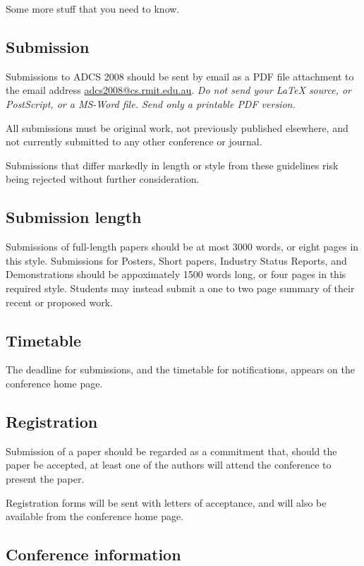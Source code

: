 \documentclass[twocolumn]{article}
\begin{document}
Some more stuff that you need to know.

\subsection{Submission}

Submissions to ADCS 2008 should be sent by email as a PDF file
attachment to the email address \url{adcs2008@cs.rmit.edu.au}.
\emph{Do not send your {\LaTeX} source, or PostScript, or a MS-Word
  file.  Send only a printable PDF version.}

All submissions must be original work, not previously published 
elsewhere, and not currently submitted to any other conference or
journal.

Submissions that differ markedly in length or style from these
guidelines risk being rejected without further consideration.

\subsection{Submission length}

Submissions of full-length papers should be at most 3000 words, or
eight pages in this style.  Submissions for Posters, Short papers,
Industry Status Reports, and Demonstrations should be appoximately
1500 words long, or four pages in this required style.  Students may
instead submit a one to two page summary of their recent or proposed
work.

\subsection{Timetable}

The deadline for submissions, and the timetable for notifications,
appears on the conference home page.

\subsection{Registration}

Submission of a paper should be regarded as a commitment that, should
the paper be accepted, at least one of the authors will attend the
conference to present the paper.

Registration forms will be sent with letters of acceptance, and will
also be available from the conference home page.

\subsection{Conference information}
\end{document}
